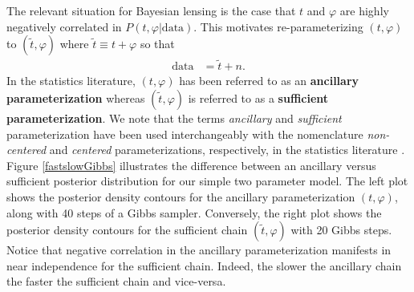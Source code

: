 \documentclass[iop,revtex4,apj,onecolumn]{emulateapj}
\begin{document}
The relevant situation for Bayesian lensing is the case that $ t$ and $\varphi$ are highly negatively correlated in $P( t, \varphi|\text{data})$.  This motivates re-parameterizing $( t,\varphi)$ to $(\widetilde  t, \varphi)$ where $\widetilde  t \equiv  t + \varphi$ so that
\begin{align*}
\text{data} &= \widetilde  t + n.
\end{align*}
In the statistics literature,  $( t, \varphi)$ has been referred to as an {\bf ancillary parameterization} whereas $(\widetilde  t, \varphi)$ is referred to as a {\bf sufficient parameterization}.
We note that the terms {\em ancillary} and {\em sufficient } parameterization have been used interchangeably with the nomenclature {\em non-centered} and {\em centered } parameterizations, respectively, in the statistics literature \cite{bernardo2003non,gelfand1995efficient,papaspiliopoulos2008stability,papaspiliopoulos2007general,yu2011center}.  Figure  \ref{fastslowGibbs} illustrates the difference between an ancillary versus sufficient posterior distribution for our simple two parameter model. The left plot shows the posterior density contours for the ancillary parameterization $( t, \varphi)$, along with 40 steps of a Gibbs sampler.  Conversely, the right plot shows the posterior density contours for the sufficient chain $(\widetilde  t, \varphi)$ with 20 Gibbs steps. Notice that negative correlation  in the ancillary parameterization manifests in near independence for the sufficient chain.  Indeed, the slower the ancillary chain the faster the sufficient chain and vice-versa.
\end{document}

